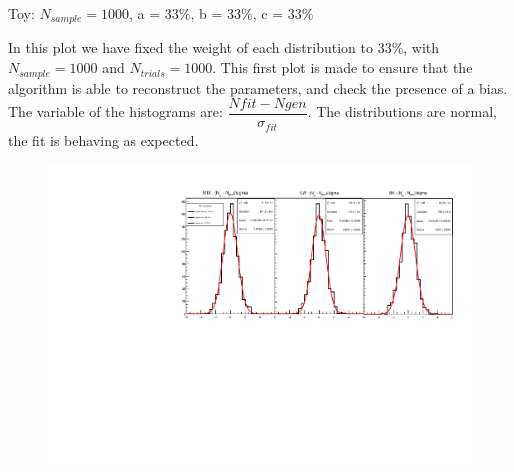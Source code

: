 \documentclass[9pt]{beamer}
\newcommand{\nologo}{\setbeamertemplate{logo}{}}
\begin{document}
{\nologo
\begin{frame}[t]{Toy: $N_{sample} = 1000$, a = $ 33\%$, b = $33\%$, c = $33\%$}

In this plot we have fixed the weight of each distribution to $33\%$, with $N_{sample} = 1000$ and $N_{trials} = 1000$. This first plot is made to ensure that the algorithm is able to reconstruct the parameters, and check the presence of a bias.
The variable of the histograms are: $\dfrac{Nfit - Ngen}{\sigma_{fit}}$. The distributions are normal, the fit is behaving as expected.

\begin{figure}[!t]
\includegraphics[width = 1\textwidth]{N1000/ToyNmix(33,33,33).pdf} 
\end{figure}
\end{frame}
}
\end{document}

